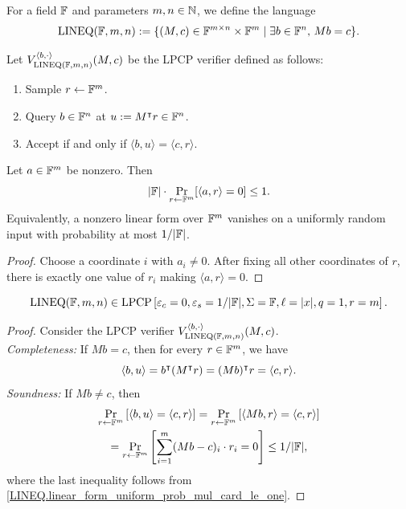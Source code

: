 \begin{definition}\label{LINEQ}\leanok
For a field \(\mathbb{F}\) and parameters \(m, n \in \mathbb{N}\), we define the language
\[\mathrm{LINEQ}(\mathbb{F},m,n) := \{ (M, c) \in \mathbb{F}^{m\times n} \times \mathbb{F}^{m} \mid \exists b\in \mathbb{F}^n, \, Mb = c \}.\]
\end{definition}
\begin{definition}\label{LINEQ.verifier}\leanok
Let \(V_{\mathrm{LINEQ}(\mathbb{F},m,n)}^{\langle b, \cdot \rangle } (M,c)\) be the LPCP verifier defined as follows:
\begin{enumerate}
  \item Sample \(r \leftarrow \mathbb{F}^m\).
  \item Query \(b\in \mathbb{F}^n \) at \(u:= M^{\intercal}r \in \mathbb{F}^n\).
  \item Accept if and only if \(\langle b,u\rangle = \langle c, r\rangle\).
\end{enumerate}
\end{definition}

\begin{lemma}
\label{LINEQ.linear_form_uniform_prob_mul_card_le_one}
\leanok
Let \(a\in\mathbb{F}^m\) be nonzero. Then
\[
  |\mathbb{F}|\cdot\Pr_{r\leftarrow\mathbb{F}^m}\!\left[\langle a,r\rangle=0\right]\leq 1.
\]
Equivalently, a nonzero linear form over \(\mathbb{F}^m\) vanishes on a uniformly
random input with probability at most \(1/|\mathbb{F}|\).
\end{lemma}
\begin{proof}\leanok
Choose a coordinate \(i\) with \(a_i\neq 0\). After fixing all other
coordinates of \(r\), there is exactly one value of \(r_i\) making
\(\langle a,r\rangle=0\).
\end{proof}

\begin{theorem}\label{LINEQ_LPCP}\leanok
  \[\mathrm{LINEQ}(\mathbb{F},m,n) \in \mathrm{LPCP}\left[\varepsilon_c=0, \varepsilon_s= 1 / |\mathbb{F}|, \Sigma = \mathbb{F}, \ell = |x|, q = 1, r = m\right].\]
\end{theorem}
\begin{proof}\leanok
Consider the LPCP verifier \(V_{\mathrm{LINEQ}(\mathbb{F},m,n)}^{\langle b, \cdot \rangle } (M,c)\).\\
\emph{Completeness:} If \(Mb =c\), then for every \(r \in \mathbb{F}^m\), we have \[\langle b, u \rangle = b^{\intercal} (M^{\intercal} r) = (Mb)^{\intercal} r = \langle c , r\rangle.\]
\emph{Soundness:} If \(Mb \neq c\), then 
\begin{gather*}
  \Pr_{r\leftarrow \mathbb{F}^m} \left[\langle b, u \rangle =  \langle c , r\rangle \right] = \Pr_{r\leftarrow \mathbb{F}^m} \left[\langle Mb, r \rangle =  \langle c , r\rangle \right] 
  \\= \Pr_{r\leftarrow \mathbb{F}^m} \left[ \sum_{i=1}^{m} (Mb - c)_{i} \cdot r_{i} =  0\right] \leq 1 / |\mathbb{F}|,
\end{gather*}
where the last inequality follows from \ref{LINEQ.linear_form_uniform_prob_mul_card_le_one}.
\end{proof}
